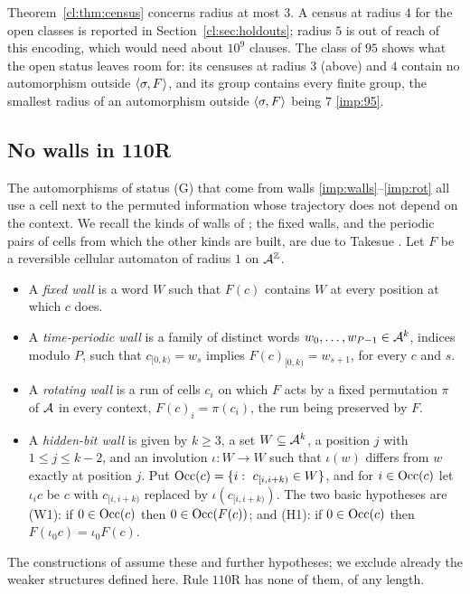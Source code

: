 Theorem~\ref{cl:thm:census} concerns radius at most $3$. A census at radius $4$ for the open classes is reported in Section~\ref{cl:sec:holdouts}; radius $5$ is out of reach of this encoding, which would need about $10^9$ clauses. The class of $95$ shows what the open status leaves room for: its censuses at radius $3$ (above) and $4$ \cite[Lemma~6.20]{PaperE} contain no automorphism outside $\langle\sigma,F\rangle$, and its group contains every finite group, the smallest radius of an automorphism outside $\langle\sigma,F\rangle$ being $7$ \eqref{imp:95}.

\subsection{No walls in 110R}\label{cl:sec:nowalls}

The automorphisms of status (G) that come from walls \eqref{imp:walls}--\eqref{imp:rot} all use a cell next to the permuted information whose trajectory does not depend on the context. We recall the kinds of walls of \cite{PaperC}; the fixed walls, and the periodic pairs of cells from which the other kinds are built, are due to Takesue \cite[Section~4]{Takesue1989}. Let $F$ be a reversible cellular automaton of radius $1$ on $\mathcal{A}^{\mathbb{Z}}$.
\begin{itemize}
\item A \emph{fixed wall} is a word $W$ such that $F(c)$ contains $W$ at every position at which $c$ does.
\item A \emph{time-periodic wall} is a family of distinct words $w_0,\dots,w_{P-1}\in\mathcal{A}^k$, indices modulo $P$, such that $c_{[0,k)}=w_s$ implies $F(c)_{[0,k)}=w_{s+1}$, for every $c$ and $s$.
\item A \emph{rotating wall} is a run of cells $c_i$ on which $F$ acts by a fixed permutation $\pi$ of $\mathcal{A}$ in every context, $F(c)_i=\pi(c_i)$, the run being preserved by $F$.
\item A \emph{hidden-bit wall} is given by $k\ge3$, a set $W\subseteq\mathcal{A}^k$, a position $j$ with $1\le j\le k-2$, and an involution $\iota\colon W\to W$ such that $\iota(w)$ differs from $w$ exactly at position $j$. Put $\operatorname{Occ}(c)=\{i:\ c_{[i,i+k)}\in W\}$, and for $i\in\operatorname{Occ}(c)$ let $\iota_ic$ be $c$ with $c_{[i,i+k)}$ replaced by $\iota(c_{[i,i+k)})$. The two basic hypotheses are \textup{(W1)}: if $0\in\operatorname{Occ}(c)$ then $0\in\operatorname{Occ}(F(c))$; and \textup{(H1)}: if $0\in\operatorname{Occ}(c)$ then $F(\iota_0c)=\iota_0F(c)$.
\end{itemize}
The constructions of \cite{PaperC} assume these and further hypotheses; we exclude already the weaker structures defined here. Rule $110$R has none of them, of any length.


